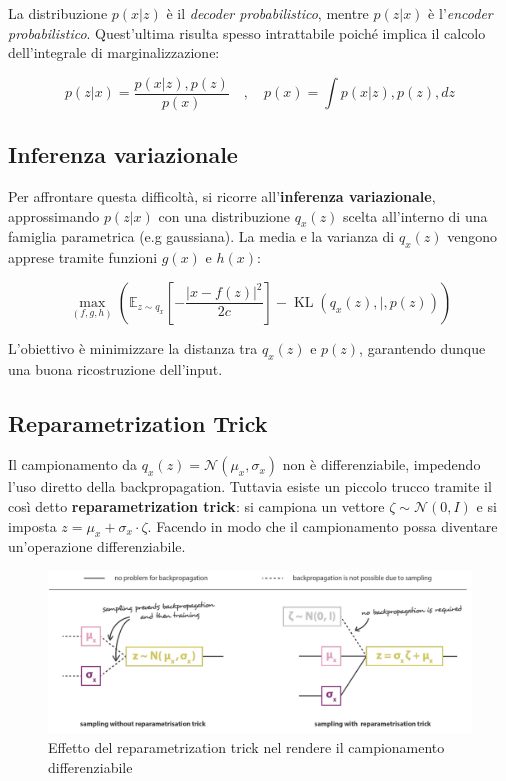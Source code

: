 La distribuzione $p(x|z)$ è il \textit{decoder probabilistico}, mentre $p(z|x)$ è l'\textit{encoder probabilistico}. Quest’ultima risulta spesso intrattabile poiché implica il calcolo dell’integrale di marginalizzazione:

\begin{equation}
    p(z|x) = \frac{p(x|z),p(z)}{p(x)} \quad,\quad p(x) = \int p(x|z),p(z),dz
\end{equation}

\subsection{Inferenza variazionale}

Per affrontare questa difficoltà, si ricorre all’\textbf{inferenza variazionale}, approssimando $p(z|x)$ con una distribuzione $q_x(z)$ scelta all’interno di una famiglia parametrica (e.g gaussiana). La media e la varianza di $q_x(z)$ vengono apprese tramite funzioni $g(x)$ e $h(x)$:

\begin{equation}
    \max_{(f,g,h)} \left( \mathbb{E}_{z\sim q_x}\left[-\frac{|x - f(z)|^2}{2c}\right] - \operatorname{KL}(q_x(z),|,p(z)) \right)
\end{equation}

L’obiettivo è minimizzare la distanza tra $q_x(z)$ e $p(z)$, garantendo dunque una buona ricostruzione dell’input.

\subsection{Reparametrization Trick}

Il campionamento da $q_x(z) = \mathcal{N}(\mu_x, \sigma_x)$ non è differenziabile, impedendo l’uso diretto della backpropagation. Tuttavia esiste un piccolo trucco tramite il così detto \textbf{reparametrization trick}: si campiona un vettore $\zeta \sim \mathcal{N}(0,I)$ e si imposta $z = \mu_x + \sigma_x \cdot \zeta$. Facendo in modo che il campionamento possa diventare un'operazione differenziabile.

\begin{figure}[!ht]
\centering
\includegraphics[width=\textwidth]{figure/RepTrick.png}
\caption{Effetto del reparametrization trick nel rendere il campionamento differenziabile}
\label{fig:repTrick}
\end{figure}
